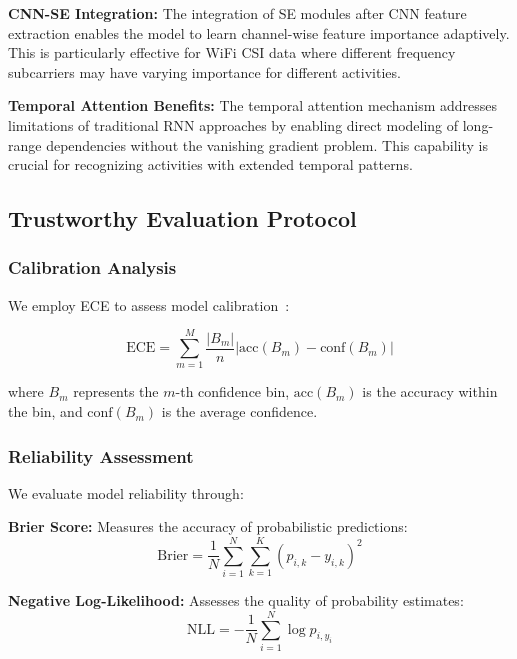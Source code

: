 \documentclass[journal]{IEEEtran}
\begin{document}
\textbf{CNN-SE Integration:} The integration of SE modules after CNN feature extraction enables the model to learn channel-wise feature importance adaptively. This is particularly effective for WiFi CSI data where different frequency subcarriers may have varying importance for different activities.

\textbf{Temporal Attention Benefits:} The temporal attention mechanism addresses limitations of traditional RNN approaches by enabling direct modeling of long-range dependencies without the vanishing gradient problem. This capability is crucial for recognizing activities with extended temporal patterns.

\subsection{Trustworthy Evaluation Protocol}

\subsubsection{Calibration Analysis}

We employ ECE to assess model calibration~\cite{calibration_guo2017}:

\begin{equation}
\text{ECE} = \sum_{m=1}^{M} \frac{|B_m|}{n} |\text{acc}(B_m) - \text{conf}(B_m)|
\end{equation}

where $B_m$ represents the $m$-th confidence bin, $\text{acc}(B_m)$ is the accuracy within the bin, and $\text{conf}(B_m)$ is the average confidence.

\subsubsection{Reliability Assessment}

We evaluate model reliability through:

\textbf{Brier Score:} Measures the accuracy of probabilistic predictions:
\begin{equation}
\text{Brier} = \frac{1}{N} \sum_{i=1}^{N} \sum_{k=1}^{K} (p_{i,k} - y_{i,k})^2
\end{equation}

\textbf{Negative Log-Likelihood:} Assesses the quality of probability estimates:
\begin{equation}
\text{NLL} = -\frac{1}{N} \sum_{i=1}^{N} \log p_{i,y_i}
\end{equation}
\end{document}
